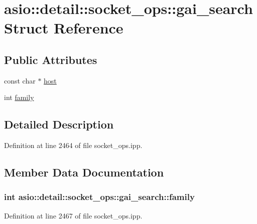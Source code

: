 \hypertarget{structasio_1_1detail_1_1socket__ops_1_1gai__search}{}\section{asio\+:\+:detail\+:\+:socket\+\_\+ops\+:\+:gai\+\_\+search Struct Reference}
\label{structasio_1_1detail_1_1socket__ops_1_1gai__search}
\subsection*{Public Attributes}
\begin{DoxyCompactItemize}
\item 
const char $\ast$ \hyperlink{structasio_1_1detail_1_1socket__ops_1_1gai__search_ae3775a9ebda48fefcd1905a07770e001}{host}
\item 
int \hyperlink{structasio_1_1detail_1_1socket__ops_1_1gai__search_aa8d81bfa5966dab58f36cb3323d0d1d7}{family}
\end{DoxyCompactItemize}


\subsection{Detailed Description}


Definition at line 2464 of file socket\+\_\+ops.\+ipp.



\subsection{Member Data Documentation}
\hypertarget{structasio_1_1detail_1_1socket__ops_1_1gai__search_aa8d81bfa5966dab58f36cb3323d0d1d7}{}
\subsubsection[{family}]{\setlength{\rightskip}{0pt plus 5cm}int asio\+::detail\+::socket\+\_\+ops\+::gai\+\_\+search\+::family}\label{structasio_1_1detail_1_1socket__ops_1_1gai__search_aa8d81bfa5966dab58f36cb3323d0d1d7}


Definition at line 2467 of file socket\+\_\+ops.\+ipp.

